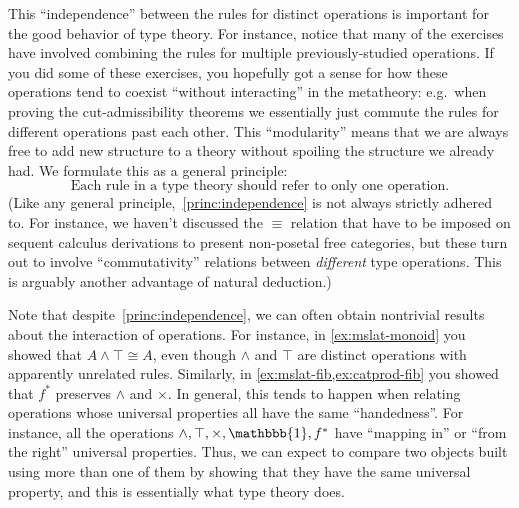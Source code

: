 \documentclass{book}
\let\meet\wedge
\def\unit{\mathbbb{1}}%
\begin{document}
This ``independence'' between the rules for distinct operations is important for the good behavior of type theory.
For instance, notice that many of the exercises have involved combining the rules for multiple previously-studied operations.
If you did some of these exercises, you hopefully got a sense for how these operations tend to coexist ``without interacting'' in the metatheory: e.g.\
when proving the cut-admissibility theorems we essentially just commute the rules for different operations past each other.
This ``modularity'' means that we are always free to add new structure to a theory without spoiling the structure we already had.
We formulate this as a general principle:
\begin{equation}\label{princ:independence}
  \text{Each rule in a type theory should refer to only one operation}.\tag{$\ast$}
\end{equation}
(Like any general principle,~\eqref{princ:independence} is not always strictly adhered to.
For instance, we haven't discussed the $\equiv$ relation that have to be imposed on sequent calculus derivations to present non-posetal free categories, but these turn out to involve ``commutativity'' relations between \emph{different} type operations.
This is arguably another advantage of natural deduction.)

Note that despite~\eqref{princ:independence}, we can often obtain nontrivial results about the interaction of operations.
For instance, in \cref{ex:mslat-monoid} you showed that $A\meet \top\cong A$, even though $\meet$ and $\top$ are distinct operations with apparently unrelated rules.
Similarly, in \cref{ex:mslat-fib,ex:catprod-fib} you showed that $f^*$ preserves $\meet$ and $\times$.
In general, this tends to happen when relating operations whose universal properties all have the same ``handedness''.
For instance, all the operations $\meet,\top,\times,\unit,f^*$ have ``mapping in'' or ``from the right'' universal properties.
Thus, we can expect to compare two objects built using more than one of them by showing that they have the same universal property, and this is essentially what type theory does.
\end{document}
